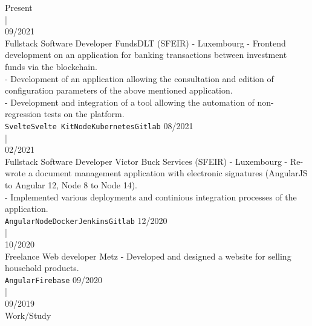 \documentclass[8pt]{developercv} %
\begin{document}
\begin{entrylist}
	\entry
		{Present\vspace{0.6cm}\\\hspace*{0.6cm}|\vspace{0.6cm}\\ 09/2021\\\footnotesize{}}
		{Fullstack Software Developer}
		{FundsDLT (SFEIR) - Luxembourg}
		{- Frontend development on an application for banking transactions between investment funds via the blockchain. \\
		- Development of an application allowing the consultation and edition of configuration parameters of the above mentioned application.\\
        - Development and integration of a tool allowing the automation of non-regression tests on the platform.\\ 
        \texttt{Svelte}\slashsep\texttt{Svelte Kit}\slashsep\texttt{Node}\slashsep\texttt{Kubernetes}\slashsep\texttt{Gitlab}}
	\entry
		{08/2021\vspace{0.4cm}\\\hspace*{0.6cm}|\vspace{0.4cm}\\ 02/2021\\\footnotesize{}}
		{Fullstack Software Developer}
		{Victor Buck Services (SFEIR) - Luxembourg}
		{- Re-wrote a document management application with electronic signatures (AngularJS to Angular 12, Node 8 to Node 14).\\
		 - Implemented various deployments and continious integration processes of the application. \\
		\texttt{Angular}\slashsep\texttt{Node}\slashsep\texttt{Docker}\slashsep\texttt{Jenkins}\slashsep\texttt{Gitlab}}
	\entry
		{12/2020\vspace{0.1cm}\\\hspace*{0.6cm}|\vspace{0.1cm}\\ 10/2020\\\footnotesize{Freelance}}
		{Web developer}
		{Metz}
		{- Developed and designed a website for selling household products. \\
		\texttt{Angular}\slashsep\texttt{Firebase}}
	\entry
		{09/2020\vspace{0.6cm}\\\hspace*{0.6cm}|\vspace{0.6cm}\\ 09/2019\\\footnotesize{Work/Study}}

\end{entrylist}
\end{document}
